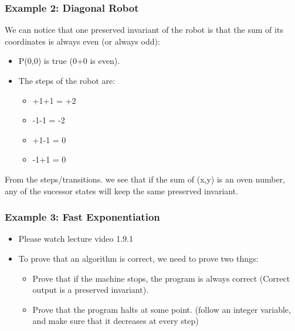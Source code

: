 \documentclass{beamer}
\begin{document}
\begin{frame}
  \frametitle{Example 2: Diagonal Robot}

  {\larger
  We can notice that one preserved invariant of the robot is that the
  sum of its coordinates is always even (or always odd):

  \bigskip
  \begin{itemize}
  \item P(0,0) is true (0+0 is even).
  \item The steps of the robot are:
    \begin{itemize}
    \item +1+1 = +2
    \item -1-1 = -2
    \item +1-1 = 0
    \item -1+1 = 0
    \end{itemize}
  \end{itemize}

  \bigskip

  From the steps/transitions. we see that if the sum of (x,y) is an
  oven number, any of the sucessor states will keep the same preserved
  invariant.
  
  }
\end{frame}

\begin{frame}
  \frametitle{Example 3: Fast Exponentiation}

  {\larger
    \begin{itemize}
    \item Please watch lecture video 1.9.1

      \bigskip
      
    \item To prove that an algorithm is correct, we need to prove two thngs:
      \begin{itemize}
      \item Prove that if the machine stops, the program is always
        correct (Correct output is a preserved invariant).
      \item Prove that the program halts at some point.  (follow an
        integer variable, and make sure that it decreases at every
        step)
      \end{itemize}
    \end{itemize}

    
  }
\end{frame}

\end{document}
